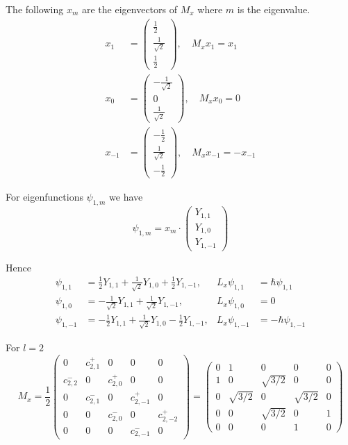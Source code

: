 The following $x_m$ are the eigenvectors of $M_x$ where $m$ is the eigenvalue.
\begin{align*}
x_1&=\begin{pmatrix}\frac{1}{2}\\[1ex]\frac{1}{\sqrt2}\\[1ex]\frac{1}{2}\end{pmatrix},\quad M_xx_1=x_1
\\[1ex]
x_0&=\begin{pmatrix}-\frac{1}{\sqrt2}\\[1ex]0\\[1ex]\frac{1}{\sqrt2}\end{pmatrix},\quad M_xx_0=0
\\[1ex]
x_{-1}&=\begin{pmatrix}-\frac{1}{2}\\[1ex]\frac{1}{\sqrt2}\\[1ex]-\frac{1}{2}\end{pmatrix},\quad
M_xx_{-1}=-x_{-1}
\end{align*}

For eigenfunctions $\psi_{1,m}$ we have
\begin{equation*}
\psi_{1,m}=x_m\cdot\begin{pmatrix}Y_{1,1}\\[1ex]Y_{1,0}\\[1ex]Y_{1,-1}\end{pmatrix}
\end{equation*}

Hence
\begin{align*}
\psi_{1,1}&=\frac{1}{2}Y_{1,1}+\frac{1}{\sqrt2}Y_{1,0}+\frac{1}{2}Y_{1,-1},
& L_x\psi_{1,1}&=\hbar\psi_{1,1}
\\[1ex]
\psi_{1,0}&=-\frac{1}{\sqrt2}Y_{1,1}+\frac{1}{\sqrt2}Y_{1,-1},
& L_x\psi_{1,0}&=0
\\[1ex]
\psi_{1,-1}&=-\frac{1}{2}Y_{1,1}+\frac{1}{\sqrt2}Y_{1,0}-\frac{1}{2}Y_{1,-1},
& L_x\psi_{1,-1}&=-\hbar\psi_{1,-1}
\end{align*}

For $l=2$
\begin{equation*}
M_x=\frac{1}{2}\begin{pmatrix}
0 & c_{2,1}^+ & 0 & 0 & 0
\\[1ex]
c_{2,2}^- & 0 & c_{2,0}^+ & 0 & 0
\\[1ex]
0 & c_{2,1}^- & 0 & c_{2,-1}^+ & 0
\\[1ex]
0 & 0 & c_{2,0}^- & 0 & c_{2,-2}^+
\\[1ex]
0 & 0 & 0 &c_{2,-1}^- & 0
\end{pmatrix}
=
\begin{pmatrix}
0 & 1 & 0 & 0 & 0
\\[1ex]
1 & 0 & \sqrt{3/2} & 0 & 0
\\[1ex]
0 & \sqrt{3/2} & 0 & \sqrt{3/2} & 0
\\[1ex]
0 & 0 & \sqrt{3/2} & 0 & 1
\\[1ex]
0 & 0 & 0 & 1 & 0
\end{pmatrix}
\end{equation*}

